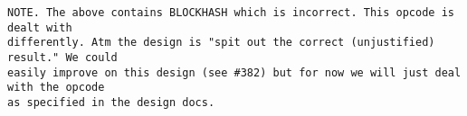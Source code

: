\documentclass[varwidth=\maxdimen,margin=0.5cm,multi={verbatim}]{standalone}
\begin{document}
\begin{verbatim}
NOTE. The above contains BLOCKHASH which is incorrect. This opcode is dealt with
differently. Atm the design is "spit out the correct (unjustified) result." We could
easily improve on this design (see #382) but for now we will just deal with the opcode
as specified in the design docs.
\end{verbatim}
\end{document}
